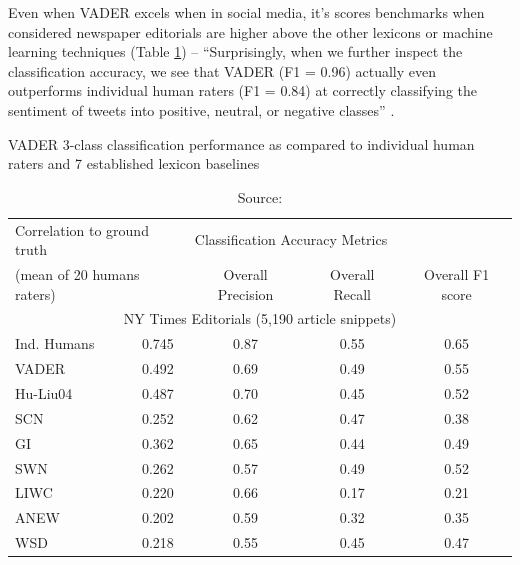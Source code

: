Even when VADER excels when in social media, it's scores benchmarks when considered newspaper editorials are higher above the other lexicons or machine learning techniques (Table \ref{tab:vaderscore}) -- ``Surprisingly, when we further inspect the classification accuracy, we see that VADER (F1 = 0.96) actually even outperforms individual human raters (F1 = 0.84) at correctly classifying the sentiment of tweets into positive, neutral, or negative classes'' \citep[p.216]{hutto2014vader}.

\begin{table}[!h]
\centering
\caption{VADER 3-class classification performance as compared to individual human raters and 7 established lexicon baselines}
\begin{tabular}{l|c|c|c|c}
\hline
\multicolumn{2}{l|}{Correlation to ground truth} & \multicolumn{3}{l}{Classification Accuracy Metrics}   \\ \cline{3-5} 
\multicolumn{2}{l|}{(mean of 20 humans raters)}  & Overall Precision & Overall Recall & Overall F1 score \\ \hline
\multicolumn{5}{c}{NY Times Editorials (5,190 article snippets)}                                         \\ \hline
Ind. Humans                & 0.745               & 0.87              & 0.55           & 0.65             \\
VADER                      & 0.492               & 0.69              & 0.49           & 0.55             \\
Hu-Liu04                   & 0.487               & 0.70              & 0.45           & 0.52             \\
SCN                        & 0.252               & 0.62              & 0.47           & 0.38             \\
GI                         & 0.362               & 0.65              & 0.44           & 0.49             \\
SWN                        & 0.262               & 0.57              & 0.49           & 0.52             \\
LIWC                       & 0.220               & 0.66              & 0.17           & 0.21             \\
ANEW                       & 0.202               & 0.59              & 0.32           & 0.35             \\
WSD                        & 0.218               & 0.55              & 0.45           & 0.47             \\ \hline 
\end{tabular}
\caption*{Source: \citep[p. 223]{hutto2014vader}}
\label{tab:vaderscore}
\end{table}

